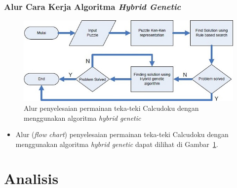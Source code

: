 \documentclass{beamer}
\begin{document}
\begin{frame}
\frametitle{Alur Cara Kerja Algoritma \textit{Hybrid Genetic}}
\begin{figure}
\centering
\captionsetup{justification=centering}
\includegraphics[scale=0.5]{Gambar/HybridGenetic7}
\caption[Alur penyelesaian permainan teka-teki Calcudoku dengan menggunakan algoritma \textit{hybrid genetic} ~\cite{johanna:12:hybrid}]{Alur penyelesaian permainan teka-teki Calcudoku dengan menggunakan algoritma \textit{hybrid genetic}}
\label{fig:hybrid7}
\end{figure}
\begin{itemize}
\item Alur (\textit{flow chart}) penyelesaian permainan teka-teki Calcudoku dengan menggunakan algoritma \textit{hybrid genetic} dapat dilihat di Gambar~\ref{fig:hybrid7}.
\end{itemize}
\end{frame}


\section{Analisis}
\end{document}
